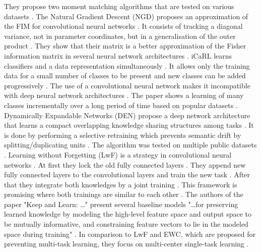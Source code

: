 They propose two moment matching algorithms that are tested on various datasets \cite{incremental-moment-matching}.
\newline
The Natural Gradient Descent (NGD) proposes an approximation of the FIM for convolutional neural networks \cite{natural_gradient_descent}.
It consists of tracking a diagonal variance, not in parameter coordinates, but in a generalisation of the outer product \cite{natural_gradient_descent}.
They show that their matrix is a better approximation of the Fisher information matrix in several neural network architectures \cite{natural_gradient_descent}.
\newline
iCaRL learns classifiers and a data representation simultaneously \cite{iCARL}.
It allows only the training data for a small number of classes to be present and new classes can be added progressively \cite{iCARL}.
The use of a convolutional neural network makes it incompatible with deep neural network architectures \cite{iCARL}.
The paper shows a learning of many classes incrementally over a long period of time based on popular datasets \cite{iCARL}.
\newline
Dynamically Expandable Networks (DEN) propose a deep network architecture that learns a compact overlapping knowledge sharing structures among tasks \cite{DEN}.
It is done by performing a selective retraining which prevents semantic drift by splitting/duplicating units \cite{DEN}.
The algorithm was tested on multiple public datasets \cite{DEN}.
\newline
Learning without Forgetting (LwF) is a strategy in convolutional neural networks \cite{LwF}.
At first they lock the old fully connected layers \cite{LwF}.
They append new fully connected layers to the convolutional layers and train the new task \cite{LwF}.
After that they integrate both knowledges by a joint training \cite{LwF}.
This framework is promising where both trainings are similar to each other \cite{incremental-moment-matching, LwF}.
\newline
The authors of the paper "Keep and Learn: …" \cite{Keep_and_Learn} present several baseline models "…for preserving learned knowledge by modeling the high-level feature space and output space to be mutually informative, and constraining feature vectors to lie in the modeled space during training" \cite{Keep_and_Learn}.
In comparison to LwF and EWC, which are proposed for preventing multi-task learning, they focus on multi-center single-task learning \cite{Keep_and_Learn}.
